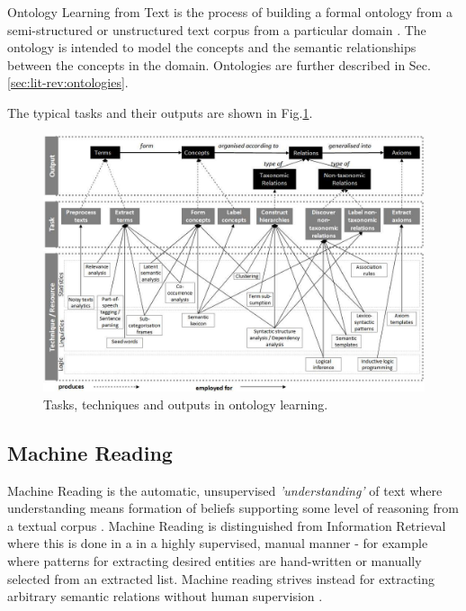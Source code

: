 \documentclass[a4paper]{report}
\begin{document}
Ontology Learning from Text is the process of building a formal ontology from a semi-structured or unstructured text corpus from a particular domain \citep[p.3-7]{Cimiano06}.
The ontology is intended to model the concepts and the semantic relationships between the concepts in the domain.
Ontologies are further described in Sec.\ref{sec:lit-rev:ontologies}.

The typical tasks and their outputs are shown in Fig.\ref{fig:output-task-technique}.

\begin{figure}
  \includegraphics[width=\textwidth]{graphics/output-task-technique-WongLiuBennamoun.png}
  \caption{Tasks, techniques and outputs in ontology learning. \cite{Wong2009PhD}}
  \label{fig:output-task-technique}
\end{figure}


\subsection{Machine Reading}

Machine Reading is the automatic, unsupervised \emph{'understanding'} of text where understanding means formation of beliefs supporting some level of reasoning from a textual corpus \citep{EtzioniEtAll06MachineReading}.
Machine Reading is distinguished from Information Retrieval where this is done in a in a highly supervised, manual manner - for example where patterns for extracting desired entities are hand-written or manually selected from an extracted list.
Machine reading strives instead for extracting arbitrary semantic relations without human supervision \citep{EtzioniEtAll06MachineReading}.
\end{document}
